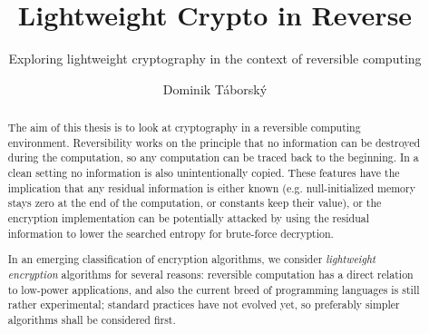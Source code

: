 \documentclass[a4paper,10pt,openright]{memoir}
\begin{document}
\thesiscomment{} %
\title{Lightweight Crypto in Reverse}
\subtitle{Exploring lightweight cryptography in the context of reversible computing}
\author{Dominik T\'{a}borsk\'{y}}

\pagestyle{plain}
\maketitle

\cleardoublepage
{}
\setcounter{page}{3}

\cleardoublepage
\pagestyle{plain}
\begin{abstract}

The aim of this thesis is to look at cryptography in a reversible 
computing environment. Reversibility works on the principle that no 
information can be destroyed during the computation, so any computation 
can be traced back to the beginning. In a clean setting no information 
is also unintentionally copied. These features have the implication 
that any residual information is either known (e.g. null-initialized 
memory stays zero at the end of the computation, or constants keep 
their value), or the encryption implementation can be potentially 
attacked by using the residual information to lower the searched 
entropy for brute-force decryption.

In an emerging classification of encryption algorithms, we 
consider \textit{lightweight encryption} algorithms for several 
reasons: reversible computation has a direct relation to low-power 
applications, and also the current breed of programming languages is 
still rather experimental; standard practices have not evolved yet, so 
preferably simpler algorithms shall be considered first.

\end{abstract}

\end{document}
